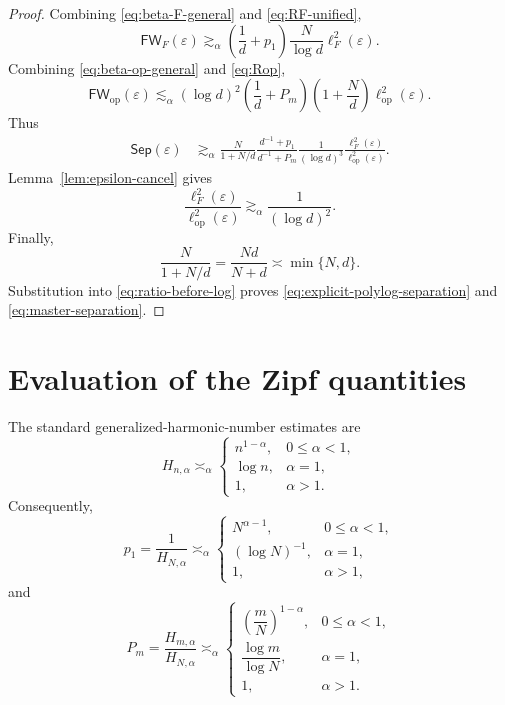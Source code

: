 \documentclass[11pt]{article}
\newcommand{\op}{\mathrm{op}}
\newcommand{\FW}{\mathsf{FW}}
\newcommand{\Sep}{\mathsf{Sep}}
\newcommand{\eps}{\varepsilon}
\begin{document}
\begin{proof}
Combining \eqref{eq:beta-F-general} and
\eqref{eq:RF-unified},
\[
\FW_F(\eps) \gtrsim_\alpha \left(\frac1d+p_1\right) \frac{N}{\log d} \ell_F^2(\eps).
\]
Combining \eqref{eq:beta-op-general} and \eqref{eq:Rop},
\[
\FW_{\op}(\eps) \lesssim_\alpha (\log d)^2 \left(\frac1d+P_m\right) \left(1+\frac Nd\right) \ell_{\op}^2(\eps).
\]
Thus
\begin{align}
\Sep(\eps) &\gtrsim_\alpha \frac{N}{1+N/d} \frac{d^{-1}+p_1}{d^{-1}+P_m} \frac1{(\log d)^3} \frac{\ell_F^2(\eps)}{\ell_{\op}^2(\eps)}.
\label{eq:ratio-before-log}
\end{align}
Lemma~\ref{lem:epsilon-cancel} gives
\[
\frac{\ell_F^2(\eps)}{\ell_{\op}^2(\eps)} \gtrsim_\alpha \frac1{(\log d)^2}.
\]
Finally,
\[
\frac{N}{1+N/d} = \frac{Nd}{N+d} \asymp \min\{N,d\}.
\]
Substitution into \eqref{eq:ratio-before-log} proves
\eqref{eq:explicit-polylog-separation} and
\eqref{eq:master-separation}.
\end{proof}

\section{Evaluation of the Zipf quantities}

The standard generalized-harmonic-number estimates are
\[
H_{n,\alpha} \asymp_\alpha
\begin{cases}
n^{1-\alpha}, & 0\le\alpha<1,\\
\log n, & \alpha=1,\\
1, & \alpha>1.
\end{cases}
\]
Consequently,
\begin{equation}
p_1 = \frac1{H_{N,\alpha}} \asymp_\alpha
\begin{cases}
N^{\alpha-1}, & 0\le\alpha<1,\\
(\log N)^{-1}, & \alpha=1,\\
1, & \alpha>1,
\end{cases}
\label{eq:p1}
\end{equation}
and
\begin{equation}
P_m = \frac{H_{m,\alpha}}{H_{N,\alpha}} \asymp_\alpha
\begin{cases}
\left(\dfrac mN\right)^{1-\alpha}, &0\le\alpha<1,\\[3mm]
\dfrac{\log m}{\log N}, &\alpha=1,\\[3mm]
1, &\alpha>1.
\end{cases}
\label{eq:Pm}
\end{equation}
\end{document}
